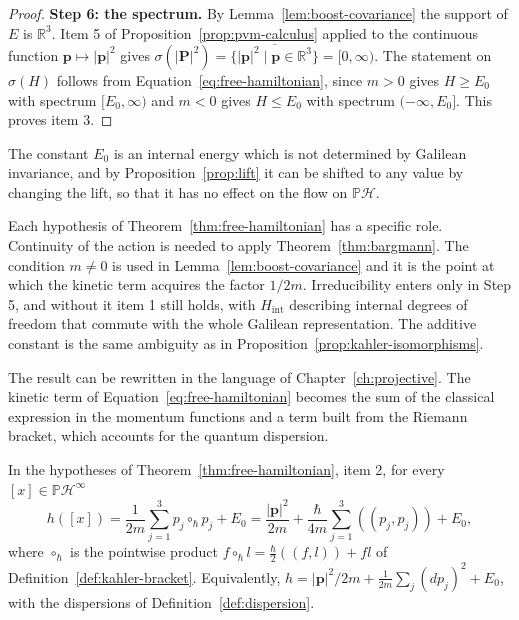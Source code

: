 \begin{proof}
	\medskip
	\noindent\textbf{Step 6: the spectrum.} By Lemma~\ref{lem:boost-covariance} the support of $E$ is $\mathbb{R}^3$. Item 5 of Proposition~\ref{prop:pvm-calculus} applied to the continuous function $\mathbf{p}\mapsto|\mathbf{p}|^2$ gives $\sigma(|\mathbf{P}|^2)=\overline{\{|\mathbf{p}|^2\mid\mathbf{p}\in\mathbb{R}^3\}}=[0,\infty)$. The statement on $\sigma(H)$ follows from Equation~\eqref{eq:free-hamiltonian}, since $m>0$ gives $H\ge E_0$ with spectrum $[E_0,\infty)$ and $m<0$ gives $H\le E_0$ with spectrum $(-\infty,E_0]$. This proves item 3.
\end{proof}

\noindent The constant $E_0$ is an internal energy which is not determined by Galilean invariance, and by Proposition~\ref{prop:lift} it can be shifted to any value by changing the lift, so that it has no effect on the flow on $\mathbb{P}\mathcal{H}$.

\begin{remark}
	Each hypothesis of Theorem~\ref{thm:free-hamiltonian} has a specific role. Continuity of the action is needed to apply Theorem~\ref{thm:bargmann}. The condition $m\neq0$ is used in Lemma~\ref{lem:boost-covariance} and it is the point at which the kinetic term acquires the factor $1/2m$. Irreducibility enters only in Step 5, and without it item 1 still holds, with $H_{\mathrm{int}}$ describing internal degrees of freedom that commute with the whole Galilean representation. The additive constant is the same ambiguity as in Proposition~\ref{prop:kahler-isomorphisms}.
\end{remark}

The result can be rewritten in the language of Chapter~\ref{ch:projective}. The kinetic term of Equation~\eqref{eq:free-hamiltonian} becomes the sum of the classical expression in the momentum functions and a term built from the Riemann bracket, which accounts for the quantum dispersion.

\begin{corollary}\label{cor:geometric-hamiltonian}
	In the hypotheses of Theorem~\ref{thm:free-hamiltonian}, item 2, for every $[x]\in\mathbb{P}\mathcal{H}^\infty$
	\begin{equation}
		h([x])=\frac{1}{2m}\sum_{j=1}^3 p_j\circ_{\hbar} p_j+E_0=\frac{|\mathbf{p}|^2}{2m}+\frac{\hbar}{4m}\sum_{j=1}^3((p_j,p_j))+E_0,
		\label{eq:geometric-hamiltonian}
	\end{equation}
	where $\circ_{\hbar}$ is the pointwise product $f\circ_{\hbar} l=\tfrac{\hbar}{2}((f,l))+fl$ of Definition~\ref{def:kahler-bracket}. Equivalently, $h=|\mathbf{p}|^2/2m+\tfrac{1}{2m}\sum_j(d p_j)^2+E_0$, with the dispersions of Definition~\ref{def:dispersion}.
\end{corollary}

